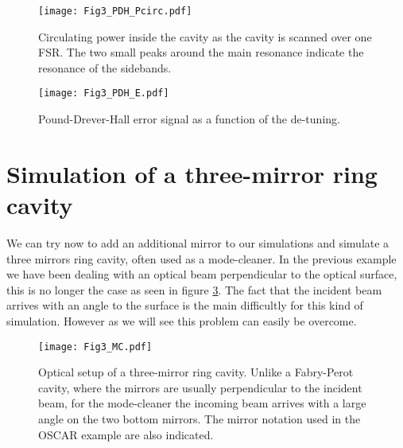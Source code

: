 \begin{figure}
\begin{center}
\texttt{[image: Fig3\_PDH\_Pcirc.pdf]}
\end{center}
\caption{Circulating power inside the cavity as the cavity is scanned over one FSR. The two small peaks around the main resonance indicate the resonance of the sidebands. \label{fig3:PDH_P}}
\end{figure}

\begin{figure}
\begin{center}
\texttt{[image: Fig3\_PDH\_E.pdf]}
\end{center}
\caption{Pound-Drever-Hall error signal as a function of the de-tuning.\label{fig3:PDH_E}}
\end{figure}

\clearpage

\section{Simulation of a three-mirror ring cavity}
\label{cha3.5}

We can try now to add an additional mirror to our simulations and simulate a three mirrors ring cavity, often used as a mode-cleaner. In the previous example we have been dealing with an optical beam perpendicular to the optical surface, this is no longer the case as seen in figure \ref{fig3:MC1}. The fact that the incident beam arrives with an angle to the surface is the main difficultly for this kind of simulation. However as we will see this problem can easily be overcome.\\

\begin{figure}
\begin{center}
\texttt{[image: Fig3\_MC.pdf]}
\end{center}
\caption{Optical setup of a three-mirror ring cavity. Unlike a Fabry-Perot cavity, where the mirrors are usually perpendicular to the incident beam, for the mode-cleaner the incoming beam arrives with a large angle on the two bottom mirrors. The mirror notation used in the OSCAR example are also indicated. \label{fig3:MC1}}
\end{figure}

